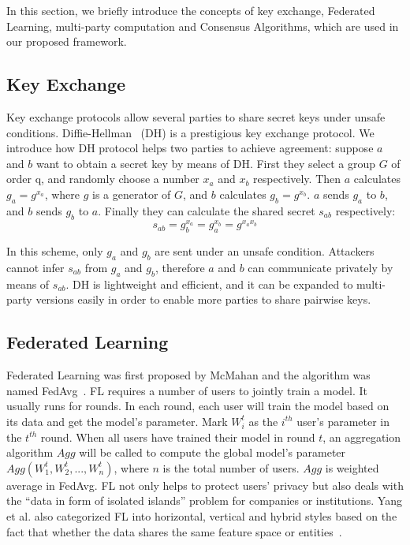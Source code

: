 In this section, we briefly introduce the concepts of key exchange, Federated Learning, multi-party computation and Consensus Algorithms, which are used in our proposed framework.

\subsection{Key Exchange}
Key exchange protocols allow several parties to share secret keys under unsafe conditions. Diffie-Hellman~\cite{DH} (DH) is a prestigious key exchange protocol. We introduce how DH protocol helps two parties to achieve agreement: suppose $a$ and $b$ want to obtain a secret key by means of DH. First they select a group $G$ of order q, and randomly choose a number $x_a$ and $x_b$ respectively. Then $a$ calculates $g_a = g^{x_a}$, where $g$ is a generator of $G$, and $b$ calculates $g_b = g^{x_b}$. $a$ sends $g_a$ to $b$, and $b$ sends $g_b$ to $a$. Finally they can calculate the shared secret $s_{ab}$ respectively:
$$ s_{ab} = g_b^{x_a}  = g_a^{x_b} = g^{x_ax_b}$$

In this scheme, only $g_a$ and $g_b$ are sent under an unsafe condition. Attackers cannot infer $s_{ab}$ from $g_a$ and $g_b$, therefore $a$ and $b$ can communicate privately by means of $s_{ab}$. DH is lightweight and efficient, and it can be expanded to multi-party versions easily in order to enable more parties to share pairwise keys.


\subsection{Federated Learning}
Federated Learning was first proposed by McMahan and the algorithm was named FedAvg~\cite{mcmahan2016communicationefficient}. FL requires a number of users to jointly train a model. It usually runs for rounds. In each round, each user will train the model based on its data and get the model's parameter. Mark $W_i^t$ as the $i^{th}$ user's parameter in the $t^{th}$ round. When all users have trained their model in round $t$, an aggregation algorithm $Agg$ will be called to compute the global model's parameter $Agg(W_1^t, W_2^t, ..., W_n^t)$, where $n$ is the total number of users. $Agg$ is weighted average in FedAvg. FL not only helps to protect users' privacy but also deals with the ``data in form of isolated islands'' problem for companies or institutions. Yang et al. also categorized FL into horizontal, vertical and hybrid styles based on the fact that whether the data shares the same feature space or entities~\cite{yang2019federated}. 

